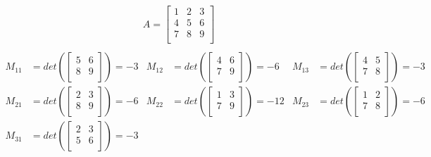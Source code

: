 \begin{example}\label{minor_example}
    \begin{align*}
        A = \begin{bmatrix}
            1 & 2 & 3 \\
            4 & 5 & 6 \\
            7 & 8 & 9 \\
        \end{bmatrix} \\
    \end{align*}
    \begin{align*}
        M_{11} & = det(\begin{bmatrix}
            5 & 6 \\
            8 & 9 \\
        \end{bmatrix}) = -3  &
        M_{12} & = det(\begin{bmatrix}
            4 & 6 \\
            7 & 9 \\
        \end{bmatrix}) = -6  &
        M_{13} & = det(\begin{bmatrix}
            4 & 5 \\
            7 & 8 \\
        \end{bmatrix}) = -3    \\
        M_{21} & = det(\begin{bmatrix}
            2 & 3 \\
            8 & 9 \\
        \end{bmatrix}) = -6  &
        M_{22} & = det(\begin{bmatrix}
            1 & 3 \\
            7 & 9 \\
        \end{bmatrix}) = -12 &
        M_{23} & = det(\begin{bmatrix}
            1 & 2 \\
            7 & 8 \\
        \end{bmatrix}) = -6    \\
        M_{31} & = det(\begin{bmatrix}
            2 & 3 \\
            5 & 6 \\
        \end{bmatrix}) = -3  &

\end{align*}
\end{example}
